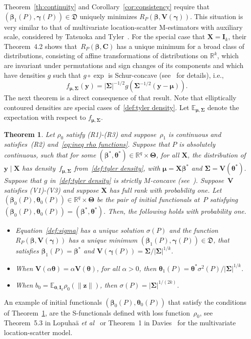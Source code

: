 \documentclass{article}
\numberwithin{equation}{section}
\theoremstyle{plain}
\newtheorem{theorem}{Theorem}
\newcommand{\R}{\mathbb{R}}
\newcommand{\bbeta}{\bm\beta}
\newcommand{\btheta}{\bm\theta}
\newcommand{\bgamma}{\bm\gamma}
\newcommand{\bmu}{\bm\mu}
\newcommand{\bSigma}{\mathbf{\Sigma}}
\newcommand{\bTheta}{\bm\Theta}
\newcommand{\by}{\mathbf{y}}
\newcommand{\bz}{\mathbf{z}}
\newcommand{\bX}{\mathbf{X}}
\newcommand{\bV}{\mathbf{V}}
\newcommand{\bI}{\mathbf{I}}
\newcommand{\bC}{\mathbf{C}}
\newcommand{\E}{\mathbb{E}}
\begin{document}
Theorem~\ref{th:continuity} and Corollary~\ref{cor:consistency} require that~$(\bbeta_1(P),\bgamma(P))\in \mathfrak{D}$ 
uniquely minimizes $R_P(\bbeta,\bV(\bgamma))$.
This situation is very similar to that of multivariate location-scatter M-estimators with
auxiliary scale, considered by Tatsuoka and Tyler~\cite{tatsuoka&tyler2000}.
For the special case that $\bX=\bI_k$, their Theorem~4.2 shows that~$R_P(\bbeta,\bC)$ has a unique minimum
for a broad class of distributions,
consisting of affine transformations of distributions on $\R^k$,
which are invariant under permutations and sign changes of its components and which have densities $g$ such that
$g\circ \exp$ is Schur-concave (see~\cite{tatsuoka&tyler2000} for details), i.e.,
\begin{equation}
\label{def:tyler density}
f_{\bmu,\bSigma}(\by)
=
|\bSigma|^{-1/2}
g(\bSigma^{-1/2}(\by-\bmu)).
\end{equation}
The next theorem is a direct consequence of that result.
Note that elliptically contoured densities 
are special cases of~\eqref{def:tyler density}.
Let $\E_{\bmu,\bSigma}$ denote the expectation with respect to $f_{\bmu,\bSigma}$.
\begin{theorem}
\label{th:davies}
Let $\rho_0$ satisfy (R1)-(R3) and suppose~$\rho_1$ is continuous and
satisfies~(R2) and~\eqref{eq:ineq rho functions}.
Suppose that $P$ is absolutely continuous,
such that for some $(\bbeta^*,\btheta^*)\in\R^q\times\bTheta$,
for all $\bX$, the distribution of $\by\mid\bX$ has density~$f_{\bmu,\bSigma}$ from~\eqref{def:tyler density}, with $\bmu=\bX\bbeta^*$ and $\bSigma=\bV(\btheta^*)$.
Suppose that $g$ in~\eqref{def:tyler density}
is strictly $M$-concave (see~\cite[Definition 4.4]{tatsuoka&tyler2000}).
Suppose~$\bV$ satisfies (V1)-(V3) and suppose $\bX$ has full rank with probability one.
Let $(\bbeta_0(P),\btheta_0(P))\in\R^{q}\times\bTheta$ be the pair of initial functionals at~$P$
satisfying $(\bbeta_0(P),\btheta_0(P))=(\bbeta^*,\btheta^*)$. 
Then, the following holds with probability one. 
\begin{itemize}
\item[(i)]
Equation~\eqref{def:sigma} has a unique solution $\sigma(P)$ 
and the function
$R_P(\bbeta,\bV(\bgamma))$ has a unique minimum $(\bbeta_1(P),\bgamma(P))\in \mathfrak{D}$,
that satisfies
$\bbeta_1(P)=\bbeta^*$  and 
$\bV(\bgamma(P))=\bSigma/|\bSigma|^{1/k}$.
\item[(ii)]
When $\bV(\alpha\btheta)=\alpha\bV(\btheta)$, for all $\alpha>0$, then $\btheta_1(P)=\btheta^*\sigma^2(P)/|\bSigma|^{1/k}$.
\item[(iii)]
When $b_0=\E_{\mathbf{0},\bI_k}\rho_0(\|\bz\|)$, then $\sigma(P)=|\bSigma|^{1/(2k)}$.
\end{itemize}
\end{theorem}
An example of initial functionals $(\bbeta_0(P),\btheta_0(P))$ that satisfy the 
conditions of Theorem~\ref{th:davies}, are the S-functionals defined with loss function~$\rho_0$,
see Theorem~5.3 in Lopuha\"a \emph{et al}~\cite{lopuhaa-gares-ruizgazen2023}
or Theorem~1 in Davies~\cite{davies1987} for the multivariate location-scatter model.
\end{document}
